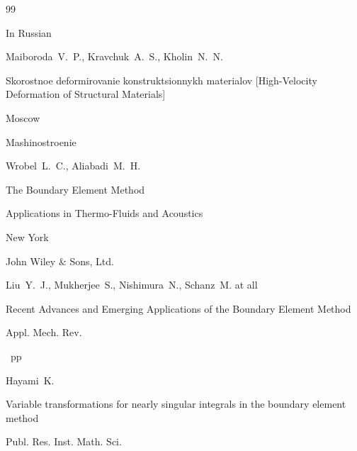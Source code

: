 \begin{thebibliography}{99}




\lang In Russian

\by Maiboroda~V.~P., Kravchuk~A.~S., Kholin~N.~N.

\book Skorostnoe deformirovanie konstruktsionnykh materialov \rm[High-Velocity Deformation of Structural Materials]

\publaddr Moscow

\publ Mashinostroenie






\by Wrobel~L.~C., Aliabadi~M.~H.

\book The Boundary Element Method


\volinfo Applications in Thermo-Fluids and Acoustics 

\publaddr New York

\publ John Wiley {\&} Sons, Ltd.






\by Liu~Y.~J., Mukherjee~S., Nishimura~N., Schanz~M. at all

\paper Recent Advances and Emerging Applications of the Boundary Element Method 

\jour Appl. Mech. Rev.





~pp \nofrills





\by Hayami~K.

\paper  Variable transformations for nearly singular integrals in the boundary element method 

\jour  Publ. Res. Inst. Math. Sci. 




\end{thebibliography}
